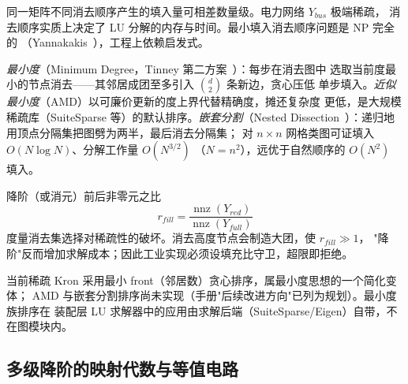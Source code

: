 \begin{remark}[消去顺序的决定性影响]
同一矩阵不同消去顺序产生的填入量可相差数量级。电力网络 $Y_{bus}$ 极端稀疏，
消去顺序实质上决定了 LU 分解的内存与时间。最小填入消去顺序问题是 NP 完全的
（Yannakakis~\cite{grf:yannakakis}），工程上依赖启发式。
\end{remark}

\begin{definition}
\emph{最小度}（Minimum Degree，Tinney 第二方案~\cite{grf:tinney}）：每步在消去图中
选取当前度最小的节点消去——其邻居成团至多引入 $\binom{d}{2}$ 条新边，贪心压低
单步填入。\emph{近似最小度}（AMD）以可廉价更新的度上界代替精确度，摊还复杂度
更低，是大规模稀疏库（SuiteSparse 等）的默认排序。\emph{嵌套分割}（Nested
Dissection~\cite{grf:georgeliu}）：递归地用顶点分隔集把图劈为两半，最后消去分隔集；
对 $n\times n$ 网格类图可证填入 $O(N\log N)$、分解工作量 $O(N^{3/2})$
（$N=n^2$），远优于自然顺序的 $O(N^2)$ 填入。
\end{definition}

\begin{definition}[填充比]
降阶（或消元）前后非零元之比
\begin{equation}
r_{fill}=\frac{\operatorname{nnz}(Y_{red})}{\operatorname{nnz}(Y_{full})}
\end{equation}
度量消去集选择对稀疏性的破坏。消去高度节点会制造大团，使 $r_{fill}\gg1$，
"降阶"反而增加求解成本；因此工业实现必须设填充比守卫，超限即拒绝。
\end{definition}

\begin{gapnote}
当前稀疏 Kron 采用最小 front（邻居数）贪心排序，属最小度思想的一个简化变体；
AMD 与嵌套分割排序尚未实现（手册"后续改进方向"已列为规划）。最小度族排序在
装配层 LU 求解器中的应用由求解后端（SuiteSparse/Eigen）自带，不在图模块内。
\end{gapnote}

\subsection{多级降阶的映射代数与等值电路}\label{sec:gr-th-compose}

